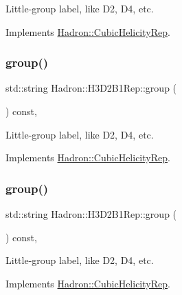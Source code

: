 Little-\/group label, like D2, D4, etc. 

Implements \mbox{\hyperlink{structHadron_1_1CubicHelicityRep_a101a7d76cd8ccdad0f272db44b766113}{Hadron\+::\+Cubic\+Helicity\+Rep}}.

\mbox{\label{structHadron_1_1H3D2B1Rep_a6fa498fcad9f73335cba8e82709d663d}} 
\subsubsection{\texorpdfstring{group()}{group()}\hspace{0.1cm}{\footnotesize\ttfamily [3/5]}}
{\footnotesize\ttfamily std\+::string Hadron\+::\+H3\+D2\+B1\+Rep\+::group (\begin{DoxyParamCaption}{ }\end{DoxyParamCaption}) const\hspace{0.3cm}{\ttfamily [inline]}, {\ttfamily [virtual]}}

Little-\/group label, like D2, D4, etc. 

Implements \mbox{\hyperlink{structHadron_1_1CubicHelicityRep_a101a7d76cd8ccdad0f272db44b766113}{Hadron\+::\+Cubic\+Helicity\+Rep}}.

\mbox{\label{structHadron_1_1H3D2B1Rep_a6fa498fcad9f73335cba8e82709d663d}} 
\subsubsection{\texorpdfstring{group()}{group()}\hspace{0.1cm}{\footnotesize\ttfamily [4/5]}}
{\footnotesize\ttfamily std\+::string Hadron\+::\+H3\+D2\+B1\+Rep\+::group (\begin{DoxyParamCaption}{ }\end{DoxyParamCaption}) const\hspace{0.3cm}{\ttfamily [inline]}, {\ttfamily [virtual]}}

Little-\/group label, like D2, D4, etc. 

Implements \mbox{\hyperlink{structHadron_1_1CubicHelicityRep_a101a7d76cd8ccdad0f272db44b766113}{Hadron\+::\+Cubic\+Helicity\+Rep}}.

\mbox{\label{structHadron_1_1H3D2B1Rep_a6fa498fcad9f73335cba8e82709d663d}} 

